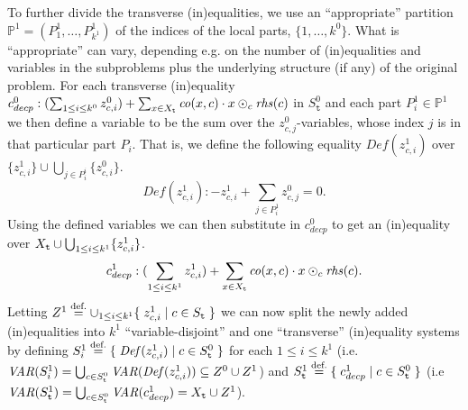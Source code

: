%
To further divide the transverse (in)equalities, we use an ``appropriate'' partition $\mathbb{P}^1 = (P^1_1, \ldots, P^1_{k^1})$ of the indices of the local parts, $\{1,\ldots, k^0\}$.
What is ``appropriate'' can vary, depending e.g. on the number of (in)equalities and variables in the subproblems plus the underlying structure (if any) of the original problem. %
For each transverse (in)equality $c^0_{decp}:(\sum_{1\leq i \leq k^0}z^0_{c,i}) + \sum_{x\in X_{\texttt{t}}}\mathit{co}(x,c)\cdot x
\odot_{c}\mathit{rhs}(c)$ in $S^0_\texttt{t}$ and each part $P^1_i\in \mathbb{P}^1$ we then define a variable to be the sum over the $z^0_{c,j}$-variables, whose index $j$ is in that particular part $P_i$. That is, we define the following equality $\mathit{Def}(z_{c,i}^1)$ over $\{z^1_{c,i}\}\cup\bigcup_{j\in P^i_i}\{z^0_{c,i}\}$.
\begin{equation}\label{eq:z1}
\mathit{Def}(z_{c,i}^1): -z_{c,i}^1 + \sum_{j\in P_i^1} z_{c,j}^{0} = 0.
\end{equation}
%
Using the defined variables we can then substitute in $c^0_{decp}$ to get an (in)equality over $X_{\texttt{t}}\cup\bigcup_{1\leq i\leq k^1}\{z^1_{c,i}\}$.
\[
c_{decp}^1: (\sum_{1\leq i\leq k^1} z^1_{c,i}) + \sum_{x\in X_{\texttt{t}}}\mathit{co}(x,c)\cdot x \odot_c \mathit{rhs}(c).
\]
Letting $Z^1 \overset{\text{def.}}= \cup_{1\leq i\leq k^1}\{\;{z^1_{c,i}}\;|\;{c\in S_{\texttt{t}}}\;\}$ we can now split the newly added (in)equalities into $k^1$ ``variable-disjoint'' and one ``transverse'' (in)equality systems by defining $S^1_i\overset{\text{def.}}=\{\;{\mathit{Def}(z^1_{c,i})}\;|\;{c\in S^0_\texttt{t}}\;\}$ for each $1\leq i\leq k^1$ (i.e. $\mathit{VAR}(S^1_i) = \bigcup_{c\in S^0_{\texttt{t}}}\mathit{VAR}(\mathit{Def}(z^1_{c,i}))\subseteq Z^0\cup Z^1$) and $S^1_\texttt{t} \overset{\text{def.}}= \{\;{c_{decp}^1}\;|\;{c\in S^0_\texttt{t}}\;\}$ (i.e $\mathit{VAR}(S^1_{\texttt{t}}) = \bigcup_{c\in S^0_{\texttt{t}}}\mathit{VAR}(c^1_{decp}) = X_{\texttt{t}}\cup Z^1$).

